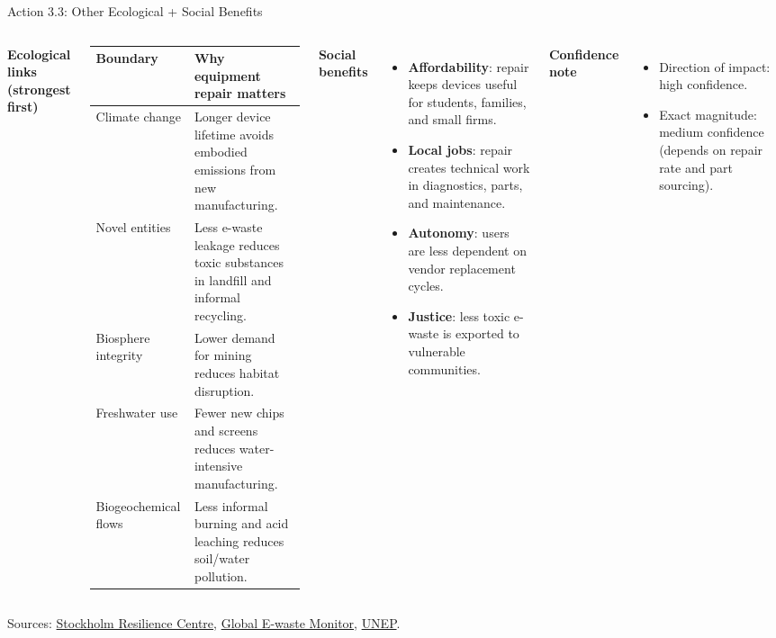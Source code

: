 \documentclass[aspectratio=169]{beamer}
\begin{document}

\begin{frame}{Action 3.3: Other Ecological + Social Benefits}
\scriptsize
\begin{columns}[T,totalwidth=\textwidth]
\textbf{Ecological links (strongest first)}
\begin{tabular}{p{2.4cm}p{4.8cm}}
\toprule
Boundary & Why equipment repair matters \\
\midrule
Climate change & Longer device lifetime avoids embodied emissions from new manufacturing. \\
Novel entities & Less e-waste leakage reduces toxic substances in landfill and informal recycling. \\
Biosphere integrity & Lower demand for mining reduces habitat disruption. \\
Freshwater use & Fewer new chips and screens reduces water-intensive manufacturing. \\
Biogeochemical flows & Less informal burning and acid leaching reduces soil/water pollution. \\
\bottomrule
\end{tabular}

\textbf{Social benefits}
\begin{itemize}
  \item \textbf{Affordability}: repair keeps devices useful for students, families, and small firms.
  \item \textbf{Local jobs}: repair creates technical work in diagnostics, parts, and maintenance.
  \item \textbf{Autonomy}: users are less dependent on vendor replacement cycles.
  \item \textbf{Justice}: less toxic e-waste is exported to vulnerable communities.
\end{itemize}

\textbf{Confidence note}
\begin{itemize}
  \item Direction of impact: high confidence.
  \item Exact magnitude: medium confidence (depends on repair rate and part sourcing).
\end{itemize}
\end{columns}
\vspace{0.08cm}
\tiny Sources: \href{https://www.stockholmresilience.org/research/planetary-boundaries.html}{Stockholm Resilience Centre}, \href{https://ewastemonitor.info/the-global-e-waste-monitor-2024/}{Global E-waste Monitor}, \href{https://www.unep.org}{UNEP}.
\end{frame}
\end{document}
